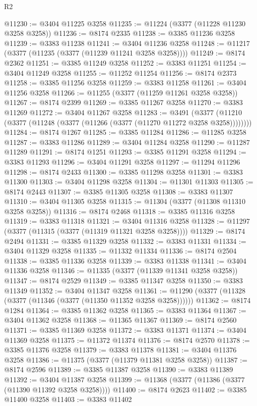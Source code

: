 \begin{lexlean}{R2}
\begin{coremodule}
@11230 := @3404 @11225 @3258
@11235 := @11224 (@3377 (@11228 @11230 @3258 @3258))
@11236 := @8174 @2335
@11238 := @3385 @11236 @3258
@11239 := @3383 @11238
@11241 := @3404 @11236 @3258
@11248 := @11217 (@3377 (@11235 (@3377 (@11239 @11241 @3258 @3258))))
@11249 := @8174 @2362
@11251 := @3385 @11249 @3258
@11252 := @3383 @11251
@11254 := @3404 @11249 @3258
@11255 := @11252 @11254
@11256 := @8174 @2373
@11258 := @3385 @11256 @3258
@11259 := @3383 @11258
@11261 := @3404 @11256 @3258
@11266 := @11255 (@3377 (@11259 @11261 @3258 @3258))
@11267 := @8174 @2399
@11269 := @3385 @11267 @3258
@11270 := @3383 @11269
@11272 := @3404 @11267 @3258
@11283 := @3491
    (@3377 (@11210 (@3377 (@11248 (@3377 (@11266 (@3377 (@11270 @11272 @3258 @3258))))))))
@11284 := @8174 @1267
@11285 := @3385 @11284
@11286 := @11285 @3258
@11287 := @3383 @11286
@11289 := @3404 @11284 @3258
@11290 := @11287 @11289
@11291 := @8174 @1251
@11293 := @3385 @11291 @3258
@11294 := @3383 @11293
@11296 := @3404 @11291 @3258
@11297 := @11294 @11296
@11298 := @8174 @2433
@11300 := @3385 @11298 @3258
@11301 := @3383 @11300
@11303 := @3404 @11298 @3258
@11304 := @11301 @11303
@11305 := @8174 @2443
@11307 := @3385 @11305 @3258
@11308 := @3383 @11307
@11310 := @3404 @11305 @3258
@11315 := @11304 (@3377 (@11308 @11310 @3258 @3258))
@11316 := @8174 @2468
@11318 := @3385 @11316 @3258
@11319 := @3383 @11318
@11321 := @3404 @11316 @3258
@11328 := @11297 (@3377 (@11315 (@3377 (@11319 @11321 @3258 @3258))))
@11329 := @8174 @2494
@11331 := @3385 @11329 @3258
@11332 := @3383 @11331
@11334 := @3404 @11329 @3258
@11335 := @11332 @11334
@11336 := @8174 @2504
@11338 := @3385 @11336 @3258
@11339 := @3383 @11338
@11341 := @3404 @11336 @3258
@11346 := @11335 (@3377 (@11339 @11341 @3258 @3258))
@11347 := @8174 @2529
@11349 := @3385 @11347 @3258
@11350 := @3383 @11349
@11352 := @3404 @11347 @3258
@11361 := @11290 (@3377 (@11328 (@3377 (@11346 (@3377 (@11350 @11352 @3258 @3258))))))
@11362 := @8174 @1284
@11364 := @3385 @11362 @3258
@11365 := @3383 @11364
@11367 := @3404 @11362 @3258
@11368 := @11365 @11367
@11369 := @8174 @2560
@11371 := @3385 @11369 @3258
@11372 := @3383 @11371
@11374 := @3404 @11369 @3258
@11375 := @11372 @11374
@11376 := @8174 @2570
@11378 := @3385 @11376 @3258
@11379 := @3383 @11378
@11381 := @3404 @11376 @3258
@11386 := @11375 (@3377 (@11379 @11381 @3258 @3258))
@11387 := @8174 @2596
@11389 := @3385 @11387 @3258
@11390 := @3383 @11389
@11392 := @3404 @11387 @3258
@11399 := @11368 (@3377 (@11386 (@3377 (@11390 @11392 @3258 @3258))))
@11400 := @8174 @2623
@11402 := @3385 @11400 @3258
@11403 := @3383 @11402

\end{coremodule}
\end{lexlean}
